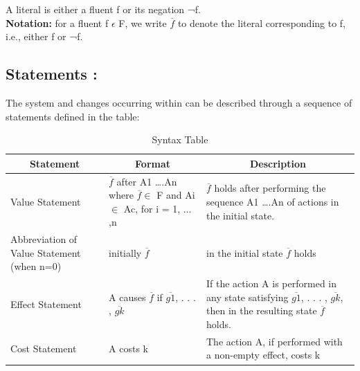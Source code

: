 \documentclass[11pt]{article}
\begin{document}
A literal is either a fluent f or its negation ¬f.\\
\textbf{Notation:} for a fluent f $\epsilon$ F, we write $\overline{f}$ to denote the literal corresponding to f, i.e., either f or ¬f.
\subsection{Statements :}\label{sec:Statements} 
	The system and changes occurring within can be described through a sequence of statements defined in the table:
	\begin{table}[H]
  \centering
    \begin{tabular}{|p{3cm}|p{4cm}|p{8cm}|}
    \hline
    \multicolumn{1}{|c|}{\textbf{Statement}} & \multicolumn{1}{c|}{\textbf{Format}} & \multicolumn{1}{c|}{\textbf{Description}} \\
    \hline
    Value Statement & $\overline{f}$ after A1 ….An where $\overline{f} \in$ F and Ai $\in$ Ac, for i = 1, ... ,n & $\overline{f}$ holds after performing the sequence A1 ….An of actions in the initial state. \\
    \hline
    Abbreviation of Value Statement (when n=0) & initially $\overline{f}$ & in the initial state $\overline{f}$ holds\\
    \hline
    Effect Statement & A causes $\overline{f}$ if $\overline{g1}$, . . . , $\overline{gk}$ & If the action A is performed in any state satisfying $\overline{g1}$, . . . , $\overline{gk}$, then in
    the resulting state $\overline{f}$ holds. \\
    \hline
    Cost Statement & A costs k & The action A, if performed with a non-empty effect, costs k \\
    \hline
    \end{tabular}
    \caption{Syntax Table}
  \label{tab:table01}
\end{table}
\end{document}
